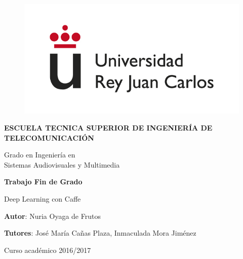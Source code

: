 \begin{titlepage}

\begin{center}

\begin{figure}[htb]
\begin{center}
	\includegraphics[width=0.6\linewidth]{figures/logo}
\end{center}
\end{figure}

\vspace{10mm}

\begin{Large}
\textbf{ESCUELA TECNICA SUPERIOR DE INGENIERÍA DE TELECOMUNICACIÓN}
\vspace{10mm}
\end{Large}

\begin{Large}
Grado en Ingeniería en\\ \vspace{2mm} Sistemas Audiovisuales y Multimedia
\end{Large}

\vspace{10mm}

\begin{large}
\textbf{Trabajo Fin de Grado}
\end{large}
\vspace{25mm}

\begin{huge}
	Deep Learning con Caffe
\end{huge}

\vspace{25mm}

\begin{large}
\textbf{Autor}: Nuria Oyaga de Frutos

\textbf{Tutores}: José María Cañas Plaza, Inmaculada Mora Jiménez 

\vspace{10mm}

Curso académico 2016/2017
\end{large}

\vspace{10mm}

\end{center}

\end{titlepage}

